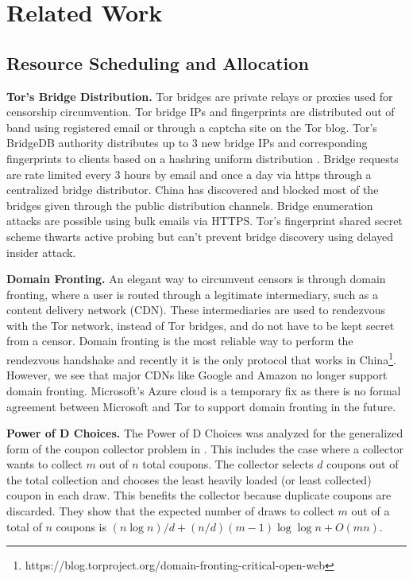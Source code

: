 
\chapter{Related Work} 
\label{sec:related}


\section{Resource Scheduling and Allocation}

\textbf{Tor's Bridge Distribution.} Tor bridges are private relays or proxies used for censorship circumvention. Tor bridge IPs and fingerprints are distributed out of band using registered email or through a captcha site on the Tor blog. Tor’s BridgeDB authority distributes up to 3 new bridge IPs and corresponding fingerprints to clients based on a hashring uniform distribution \cite{ling2015tor}. Bridge requests are rate limited every 3 hours by email and once a day via https through a centralized bridge distributor. China has discovered and blocked most of the bridges given through the public distribution channels. Bridge enumeration attacks are possible using bulk emails via HTTPS. Tor’s fingerprint shared secret scheme thwarts active probing but can’t prevent bridge discovery using delayed insider attack\cite{fifield2016censors}. 

\textbf{Domain Fronting.} An elegant way to circumvent censors is through domain fronting, where a user is routed through a legitimate intermediary, such as a content delivery network (CDN)\cite{Fifield2017a}. These intermediaries are used to rendezvous with the Tor network, instead of Tor bridges, and do not have to be kept secret from a censor. Domain fronting is the most reliable way to perform the rendezvous handshake and recently it is the only protocol that works in China\footnote{https://blog.torproject.org/domain-fronting-critical-open-web}. However, we see that major CDNs like Google and Amazon no longer support domain fronting. Microsoft's Azure cloud is a temporary fix as there is no formal agreement between Microsoft and Tor to support domain fronting in the future.

\textbf{Power of D Choices.} The Power of D Choices was analyzed for the generalized form of the coupon collector problem in \cite{xu2011generalized}. This includes the case where a collector wants to collect $m$ out of $n$ total coupons. The collector selects $d$ coupons out of the total collection and chooses the least heavily loaded (or least collected) coupon in each draw. This benefits the collector because duplicate coupons are discarded. They show that the expected number of draws to collect $m$ out of a total of $n$ coupons is $(n \log{n})/d + (n/d )(m − 1) \log{\log{n}} + O (mn)$.

